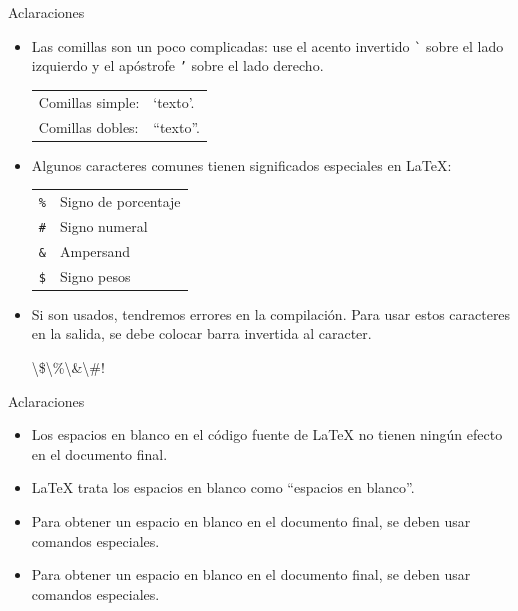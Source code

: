 \documentclass[12pt]{beamer}
\begin{document}
\begin{frame}{Aclaraciones}
  \begin{itemize}
    \item Las comillas son un poco complicadas: use el acento invertido \texttt{\`{}} sobre el lado izquierdo y el apóstrofe \texttt{'{}} sobre el lado derecho.
      
  \begin{tabular}{ll}
     Comillas simple: & `texto'.\\  
   Comillas dobles: & ``texto''.
  \end{tabular}
    \item<2-> Algunos caracteres comunes tienen significados especiales en \LaTeX:  
  \begin{center}
    \begin{tabular}{cl}
      \texttt{\%} & Signo de porcentaje \\
      \texttt{\#} & Signo numeral \\
      \texttt{\&} & Ampersand                 \\
      \texttt{\$} & Signo pesos               \\
    \end{tabular}
  \end{center}
    \item<3-> Si son usados, tendremos errores en la compilación. Para usar estos caracteres en la salida, se debe colocar barra invertida al caracter.
      \begin{center}
      \begin{minipage}{3.5cm}
        \begin{block}{}        
          \textbackslash\$\hspace{10pt}\textbackslash\%\hspace{10pt}\textbackslash\&\hspace{10pt}\textbackslash\#!              
      \end{block}
      \end{minipage}
    \end{center}      
  \end{itemize}  
\end{frame}
\begin{frame}{Aclaraciones}
  \begin{itemize}
    \item<1-> Los espacios en blanco en el código fuente de \LaTeX{} no tienen ningún efecto en el documento final.
    \item<2-> \LaTeX{} trata los espacios en blanco como ``espacios en blanco''.
    \item<3-> Para obtener un espacio en blanco en el documento final, se deben usar comandos especiales.
    \item<4-> Para obtener un espacio en blanco en el documento final, se deben usar comandos especiales.    
  \end{itemize}
\end{frame}
\end{document}
